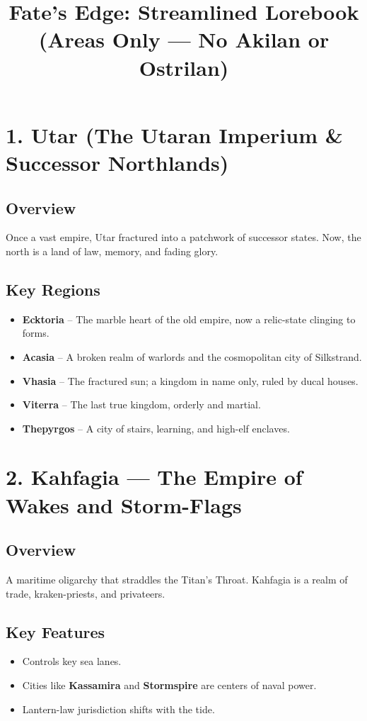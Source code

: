 \documentclass[11pt]{article}
\title{Fate's Edge: Streamlined Lorebook\\(Areas Only — No Akilan or Ostrilan)}
\author{}
\date{}
\begin{document}
\maketitle

\section*{1. Utar (The Utaran Imperium \& Successor Northlands)}

\subsection*{Overview}
Once a vast empire, Utar fractured into a patchwork of successor states. Now, the north is a land of law, memory, and fading glory.

\subsection*{Key Regions}
\begin{itemize}[leftmargin=*]
    \item \textbf{Ecktoria} – The marble heart of the old empire, now a relic-state clinging to forms.
    \item \textbf{Acasia} – A broken realm of warlords and the cosmopolitan city of Silkstrand.
    \item \textbf{Vhasia} – The fractured sun; a kingdom in name only, ruled by ducal houses.
    \item \textbf{Viterra} – The last true kingdom, orderly and martial.
    \item \textbf{Thepyrgos} – A city of stairs, learning, and high-elf enclaves.
\end{itemize}

\section*{2. Kahfagia — The Empire of Wakes and Storm-Flags}

\subsection*{Overview}
A maritime oligarchy that straddles the Titan’s Throat. Kahfagia is a realm of trade, kraken-priests, and privateers.

\subsection*{Key Features}
\begin{itemize}[leftmargin=*]
    \item Controls key sea lanes.
    \item Cities like \textbf{Kassamira} and \textbf{Stormspire} are centers of naval power.
    \item Lantern-law jurisdiction shifts with the tide.
\end{itemize}
\end{document}
